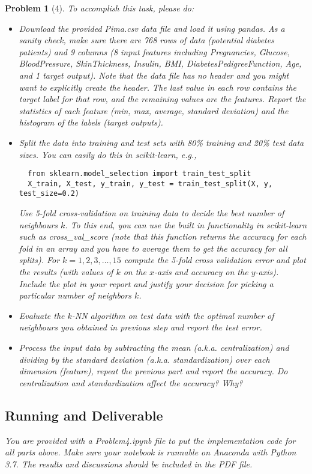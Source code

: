 \documentclass[11pt]{article}
\theoremstyle{quest}
\newtheorem*{problem}{Problem}
\begin{document}
\begin{problem}[4]
To accomplish this task, please do:
\begin{itemize}
  \item Download the provided \textsf{Pima.csv} data file and load it using \textsf{pandas}. As a sanity check, make sure there are 768 rows of data (potential diabetes patients) and 9 columns (8 input features including Pregnancies, Glucose, BloodPressure, SkinThickness, Insulin, BMI, DiabetesPedigreeFunction, Age, and 1 target output). Note that the data file has no header and you might want to explicitly create the header. The last value in each row contains the target label for that row, and the remaining values are the features. Report the statistics of each feature (min, max, average, standard deviation) and the histogram of the labels (target outputs).
  \item Split the data into training and test sets with 80\% training and 20\% test data sizes. You can easily do this in \textsf{scikit-learn}, e.g.,
  \begin{verbatim}
  from sklearn.model_selection import train_test_split
  X_train, X_test, y_train, y_test = train_test_split(X, y, test_size=0.2)
  \end{verbatim}
  Use 5-fold cross-validation on training data to decide the best number of neighbours $k$. To this end, you can use the built in functionality in \textsf{scikit-learn} such as \textsf{cross\_val\_score} (note that this function returns the accuracy for each fold in an array and you have to average them to get the accuracy for all splits). For $k = 1, 2, 3, \dots, 15$ compute the 5-fold cross validation error and plot the results (with values of $k$ on the $x$-axis and accuracy on the $y$-axis). Include the plot in your report and justify your decision for picking a particular number of neighbors $k$.
  \item Evaluate the $k$-NN algorithm on test data with the optimal number of neighbours you obtained in previous step and report the test error.
  \item Process the input data by subtracting the mean (a.k.a. centralization) and dividing by the standard deviation (a.k.a. standardization) over each dimension (feature), repeat the previous part and report the accuracy. Do centralization and standardization affect the accuracy? Why?
\end{itemize}

\subsection*{Running and Deliverable}
You are provided with a \textsf{Problem4.ipynb} file to put the implementation code for all parts above. Make sure your notebook is runnable on Anaconda with Python 3.7. The results and discussions should be included in the PDF file.
\end{problem}
\end{document}
